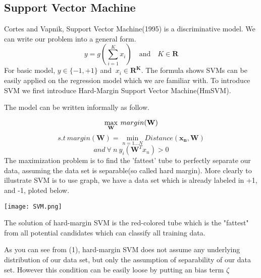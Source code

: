 \subsection{Support Vector Machine}

Cortes and Vapnik, Support Vector Machine(1995) is a discriminative model. We can write our problem into a general form.
$$ y = g(\sum^{K}_{i=1}{x_{i}}) \quad \textrm{and} \quad K \in \mathbf{R}$$
For basic model, $y \in \{-1, +1\}$  and $\ x_{i} \in \mathbf{R^{K}}$.
The formula shows SVMs can be easily applied on the regression model which we are familiar with. To introduce SVM we first introduce Hard-Margin Support Vector Machine(HmSVM).
\clearpage

The model can be written informally as follow.

$$\large{\max_{\mathbf{W}}} \ margin(\mathbf{W})$$
$$ s.t\ margin(\mathbf{W})=\min_{n=1...N} Distance(\mathbf{x_{n}},\mathbf{W})$$
$$ and\ \forall \ n \ y_{i}(\mathbf{W}^{T} x_{n})>0$$
The maximization problem is to find the 'fattest' tube to perfectly separate our data, assuming the data set is separable(so called hard margin).
More clearly to illustrate SVM is to use graph, we have a data set which is already labeled in +1, and -1, ploted below.\\

\begin{center}
{
\texttt{[image: SVM.png]}
}
\end{center}
The solution of hard-margin SVM is the red-colored tube which is the "fattest" from all potential candidates which can classify all training data.

As you can see from (1), hard-margin SVM does not assume any underlying distribution of our data set, but only the assumption of separability of our data set. However this condition can be easily loose by putting an bias term $\zeta$ 




